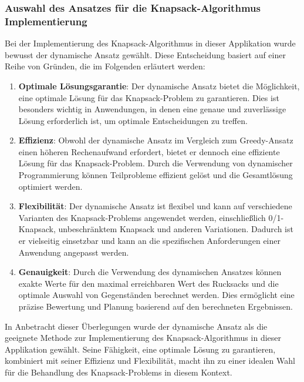 \subsubsection*{Auswahl des Ansatzes für die Knapsack-Algorithmus Implementierung}
Bei der Implementierung des Knapsack-Algorithmus in dieser Applikation wurde bewusst der dynamische Ansatz gewählt. Diese
Entscheidung basiert auf einer Reihe von Gründen, die im Folgenden erläutert werden:

\begin{enumerate}
    \item \textbf{Optimale Lösungsgarantie}: Der dynamische Ansatz bietet die Möglichkeit, eine optimale Lösung für das
    Knapsack-Problem zu garantieren. Dies ist besonders wichtig in Anwendungen, in denen eine genaue und zuverlässige Lösung
    erforderlich ist, um optimale Entscheidungen zu treffen.
    \item \textbf{Effizienz}: Obwohl der dynamische Ansatz im Vergleich zum Greedy-Ansatz einen höheren Rechenaufwand erfordert,
    bietet er dennoch eine effiziente Lösung für das Knapsack-Problem. Durch die Verwendung von dynamischer Programmierung
    können Teilprobleme effizient gelöst und die Gesamtlösung optimiert werden.
    \item \textbf{Flexibilität}: Der dynamische Ansatz ist flexibel und kann auf verschiedene Varianten des Knapsack-Problems
    angewendet werden, einschließlich 0/1-Knapsack, unbeschränktem Knapsack und anderen Variationen. Dadurch ist er vielseitig
    einsetzbar und kann an die spezifischen Anforderungen einer Anwendung angepasst werden.
    \item \textbf{Genauigkeit}: Durch die Verwendung des dynamischen Ansatzes können exakte Werte für den maximal erreichbaren
    Wert des Rucksacks und die optimale Auswahl von Gegenständen berechnet werden. Dies ermöglicht eine präzise Bewertung und
    Planung basierend auf den berechneten Ergebnissen.
\end{enumerate}

In Anbetracht dieser Überlegungen wurde der dynamische Ansatz als die geeignete Methode zur Implementierung des
Knapsack-Algorithmus in dieser Applikation gewählt. Seine Fähigkeit, eine optimale Lösung zu garantieren, kombiniert mit
seiner Effizienz und Flexibilität, macht ihn zu einer idealen Wahl für die Behandlung des Knapsack-Problems in diesem Kontext.

